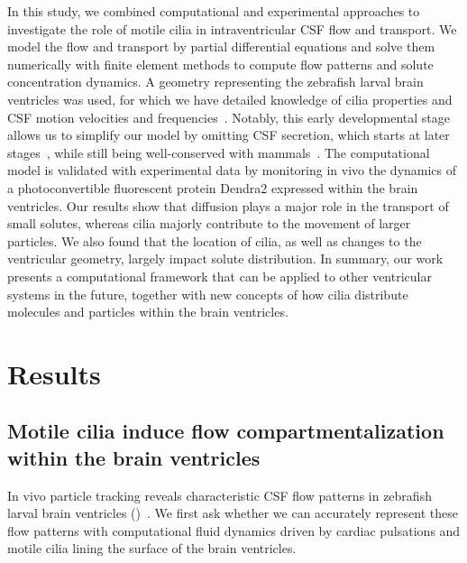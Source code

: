 \documentclass{WileyMSP-template}
\begin{document}
In this study, we combined computational and experimental approaches to investigate
the role of motile cilia in intraventricular CSF flow and transport.
We model the flow and transport by partial differential equations and solve
them numerically with finite element methods to compute flow patterns and
solute concentration dynamics. A geometry representing the zebrafish larval brain ventricles
was used, for which we have detailed knowledge of cilia properties and CSF motion velocities
and frequencies~\cite{Olstad2019CiliaryDevelopment}. 
Notably, this early developmental stage allows us to simplify our model
by omitting CSF secretion, which starts at later stages~\cite{Jeong2024TheZebrafish},
while still being well-conserved with mammals~\cite{DGama2025MotileBrain,
Olstad2019CiliaryDevelopment, Ringers2020Role, DGama2021Diversity, jurisch2020radial}. 
The computational model is validated with experimental data by monitoring in vivo
the dynamics of a photoconvertible fluorescent protein Dendra2
expressed within the brain ventricles.
Our results show that diffusion plays a major role in the transport of small solutes,
whereas cilia majorly contribute to the movement of larger particles.
We also found that the location of cilia, as well as changes to the ventricular geometry,
largely impact solute distribution. In summary, our work presents a computational
framework that can be applied to other
ventricular systems in the future, together with new concepts
of how cilia distribute molecules and
particles within the brain ventricles. 

\section{Results}

\subsection{Motile cilia induce flow compartmentalization within the brain ventricles}


In vivo particle tracking reveals characteristic CSF flow patterns in
zebrafish larval brain ventricles
()~\cite{Olstad2019CiliaryDevelopment}. We
first ask whether we can accurately represent these flow patterns with
computational fluid dynamics driven by cardiac pulsations and motile
cilia lining the surface of the brain ventricles.
\end{document}
